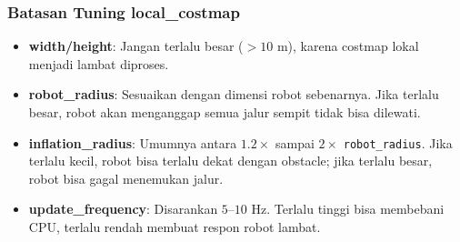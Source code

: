 \documentclass{article}
\begin{document}
\subsubsection*{Batasan Tuning local\_costmap}
\begin{itemize}
  \item \textbf{width/height}: Jangan terlalu besar ($>10$ m), karena costmap lokal menjadi lambat diproses.
  \item \textbf{robot\_radius}: Sesuaikan dengan dimensi robot sebenarnya. Jika terlalu besar, robot akan menganggap semua jalur sempit tidak bisa dilewati.
  \item \textbf{inflation\_radius}: Umumnya antara $1.2 \times$ sampai $2 \times$ \texttt{robot\_radius}. Jika terlalu kecil, robot bisa terlalu dekat dengan obstacle; jika terlalu besar, robot bisa gagal menemukan jalur.
  \item \textbf{update\_frequency}: Disarankan $5$–$10$ Hz. Terlalu tinggi bisa membebani CPU, terlalu rendah membuat respon robot lambat.
\end{itemize}
\end{document}
